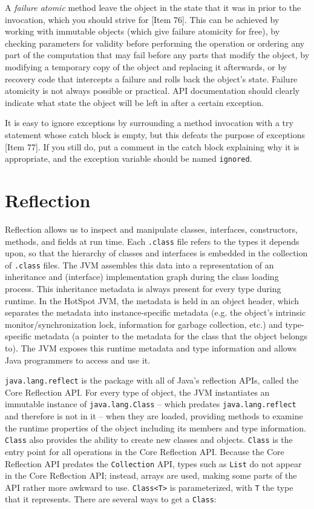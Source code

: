\documentclass[table, xcdraw]{article}%
\begin{document}
A \emph{failure atomic} method leave the object in the state that it was in prior to the invocation, which you should strive for [Item 76]. This can be achieved by working with immutable objects (which give failure atomicity for free), by checking parameters for validity before performing the operation or ordering any part of the computation that may fail before any parts that modify the object, by modifying a temporary copy of the object and replacing it afterwards, or by recovery code that intercepts a failure and rolls back the object's state. Failure atomicity is not always possible or practical. API documentation should clearly indicate what state the object will be left in after a certain exception.

It is easy to ignore exceptions by surrounding a method invocation with a try statement whose catch block is empty, but this defeats the purpose of exceptions [Item 77]. If you still do, put a comment in the catch block explaining why it is appropriate, and the exception variable should be named \texttt{ignored}.

\section{Reflection}

Reflection allows us to inspect and manipulate classes, interfaces, constructors, methods, and fields at run time. Each \texttt{.class} file refers to the types it depends upon, so that the hierarchy of classes and interfaces is embedded in the collection of \texttt{.class} files. The JVM assembles this data into a representation of an inheritance and (interface) implementation graph during the class loading process. This inheritance metadata is always present for every type during runtime. In the HotSpot JVM, the metadata is held in an object header, which separates the metadata into instance-specific metadata (e.g. the object's intrinsic monitor/synchronization lock, information for garbage collection, etc.) and type-specific metadata (a pointer to the metadata for the class that the object belongs to). The JVM exposes this runtime metadata and type information and allows Java programmers to access and use it.

\texttt{java.lang.reflect} is the package with all of Java's reflection APIs, called the Core Reflection API. For every type of object, the JVM instantiates an immutable instance of \texttt{java.lang.Class} -- which predates \texttt{java.lang.reflect} and therefore is not in it -- when they are loaded, providing methods to examine the runtime properties of the object including its members and type information. \texttt{Class} also provides the ability to create new classes and objects. \texttt{Class} is the entry point for all operations in the Core Reflection API. Because the Core Reflection API predates the \texttt{Collection} API, types such as \texttt{List} do not appear in the Core Reflection API; instead, arrays are used, making some parts of the API rather more awkward to use. \texttt{Class<T>} is parameterized, with \texttt{T} the type that it represents. There are several ways to get a \texttt{Class}:
\end{document}
